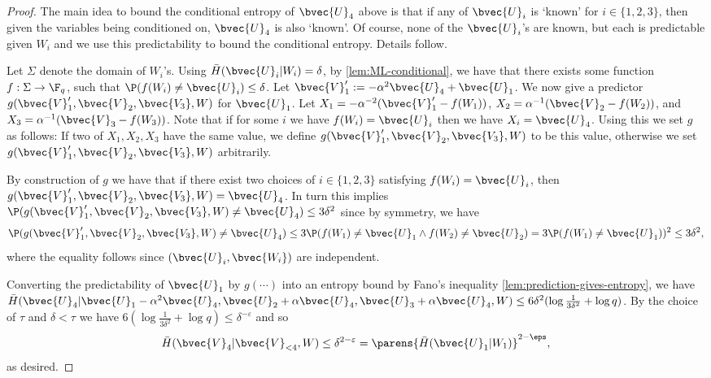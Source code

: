 \documentclass[11pt]{article}
\renewcommand{\H}{\bar{H}}
\begin{document}
\begin{proof}
	The main idea to bound the conditional entropy of $\bvec{U}_4$ above is that if any of $\bvec{U}_i$ is `known' for $i \in \{1,2,3\}$, then given the variables being conditioned on, $\bvec{U}_4$ is also `known'. Of course, none of the $\bvec{U}_i$'s are known, but each is predictable given $W_i$ and we use this predictability to bound the conditional entropy. Details follow. 
	
	Let $\Sigma$ denote the domain of $W_i$'s. Using $\H(\bvec{U}_i|W_i) = \delta$, by \cref{lem:ML-conditional}, we have that there exists some function $f: \Sigma \to \F_q$, such that $\P(f(W_i) \not= \bvec{U}_i) \leq \delta$. Let $\bvec{V}'_1 := -\alpha^2 \bvec{U}_4 + \bvec{U}_1$. We now give a predictor
	$g(\bvec{V}'_1,\bvec{V}_2,\bvec{V_3},W)$ for $\bvec{U}_1$. Let 
	$X_1 = -\alpha^{-2} (\bvec{V}'_1 - f(W_1))$, $X_2 = \alpha^{-1} (\bvec{V}_2 - f(W_2))$, and $X_3 = \alpha^{-1} (\bvec{V}_3 - f(W_3))$. Note that if for some $i$ we have $f(W_i) = \bvec{U}_i$ then we have $X_i = \bvec{U}_4$. Using this we set $g$ as follows: If  two of $X_1, X_2, X_3$ have the same value, we define $g(\bvec{V}'_1,\bvec{V}_2,\bvec{V_3},W)$  to be this value, otherwise we set $g(\bvec{V}'_1,\bvec{V}_2,\bvec{V_3},W)$ arbitrarily.
	
	By construction of $g$ we have that  if there exist two choices of $i \in \{1,2,3\}$ satisfying $f(W_i) = \bvec{U}_i$, then $g(\bvec{V}'_1,\bvec{V}_2,\bvec{V_3},W)=\bvec{U}_4$.
	In turn this implies $\P(g(\bvec{V}'_1,\bvec{V}_2,\bvec{V_3},W) \not= \bvec{U}_4) \leq 3 \delta^2$ since  by symmetry, we have \[\P(g(\bvec{V}'_1,\bvec{V}_2,\bvec{V_3},W) \not= \bvec{U}_4) \leq 3 \P(f(W_1) \not= \bvec{U}_1 \land f(W_2) \not= \bvec{U}_2) = 3 \P(f(W_1) \not= \bvec{U}_1))^2 \leq 3 \delta^2,\]
	where the equality follows since $(\bvec{U}_i,\bvec{W_i})$ are independent.
	
	Converting the predictability of $\bvec{U}_1$ by $g(\cdots)$ into an entropy bound by Fano's inequality \cref{lem:prediction-gives-entropy}, we have $\H(\bvec{U}_4 | \bvec{U}_1 - \alpha^2 \bvec{U}_4, \bvec{U}_2 + \alpha \bvec{U}_4, \bvec{U}_3 + \alpha \bvec{U}_4, W) \leq 6 \delta^2 (\log \frac{1}{3 \delta^{2}} + \log q)$. By the choice of $\tau$ and $\delta < \tau$ we have $6 (\log \frac{1}{3\delta^{2}} + \log q) \leq \delta^{-\varepsilon}$ 
	and so  
	\begin{equation}
		\label{eq:lem-7.3-proof-bound}
		\H( \bvec{V}_4 | \bvec{V}_{<4}, W) \leq \delta^{2 - \varepsilon} = \parens{\H(\bvec{U}_1|W_1)}^{2-\eps},
	\end{equation}
	as desired.
\end{proof}
\end{document}
